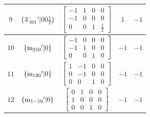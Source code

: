 \documentclass[fleqn,8pt]{jsarticle}
\begin{document}
\begin{longtable}{ccccc}
$ 9 $ & $ \{3^{-}_{\,\,001}{}'|0 0 \frac{1}{2}\} $ & $ \begin{bmatrix} -1 & 1 & 0 & 0 \\ -1 & 0 & 0 & 0 \\ 0 & 0 & 1 & \frac{1}{2} \end{bmatrix} $ & $ 1 $ & $ -1 $ \\ \hline
$ 10 $ & $ \{{\rm m}_{210}{}'|0\} $ & $ \begin{bmatrix} -1 & 0 & 0 & 0 \\ -1 & 1 & 0 & 0 \\ 0 & 0 & 1 & 0 \end{bmatrix} $ & $ -1 $ & $ -1 $ \\ \hline
$ 11 $ & $ \{{\rm m}_{120}{}'|0\} $ & $ \begin{bmatrix} 1 & -1 & 0 & 0 \\ 0 & -1 & 0 & 0 \\ 0 & 0 & 1 & 0 \end{bmatrix} $ & $ -1 $ & $ -1 $ \\ \hline
$ 12 $ & $ \{{\rm m}_{1-10}{}'|0\} $ & $ \begin{bmatrix} 0 & 1 & 0 & 0 \\ 1 & 0 & 0 & 0 \\ 0 & 0 & 1 & 0 \end{bmatrix} $ & $ -1 $ & $ -1 $ \\
\end{longtable}
\end{document}
